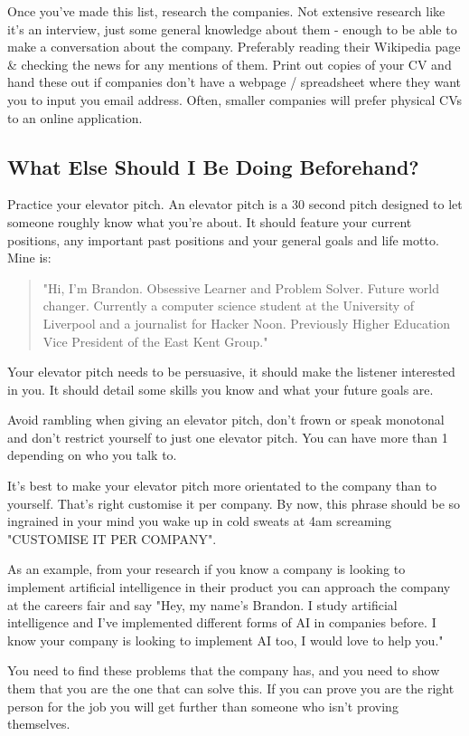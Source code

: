 \documentclass{article}
\begin{document}
Once you've made this list, research the companies. Not extensive
research like it's an interview, just some general knowledge about them
- enough to be able to make a conversation about the company. Preferably
reading their Wikipedia page \& checking the news for any mentions of
them.
Print out copies of your CV and hand these out if companies don't have a
webpage / spreadsheet where they want you to input you email address.
Often, smaller companies will prefer physical CVs to an online
application.
\subsection{What Else Should I Be Doing Beforehand?}
Practice your elevator pitch. An elevator pitch is a 30 second pitch
designed to let someone roughly know what you're about. It should
feature your current positions, any important past positions and your
general goals and life motto. Mine is:
\begin{quote}
    "Hi, I'm Brandon. Obsessive Learner and Problem Solver. Future world
changer. Currently a computer science student at the University of
Liverpool and a journalist for Hacker Noon. Previously Higher Education
Vice President of the East Kent Group."
\end{quote}
Your elevator pitch needs to be persuasive, it should make the listener
interested in you. It should detail some skills you know and what your
future goals are.

Avoid rambling when giving an elevator pitch, don't frown or speak
monotonal and don't restrict yourself to just one elevator pitch. You
can have more than 1 depending on who you talk to.

It's best to make your elevator pitch more orientated to the company
than to yourself. That's right customise it per company. By now, this
phrase should be so ingrained in your mind you wake up in cold sweats at
4am screaming "CUSTOMISE IT PER COMPANY".

As an example, from your research if you know a company is looking to
implement artificial intelligence in their product you can approach the
company at the careers fair and say "Hey, my name's Brandon. I study
artificial intelligence and I've implemented different forms of AI in
companies before. I know your company is looking to implement AI too, I
would love to help you."

You need to find these problems that the company has, and you need to
show them that you are the one that can solve this. If you can prove you
are the right person for the job you will get further than someone who
isn't proving themselves.
\end{document}
